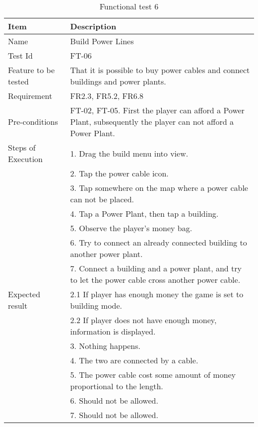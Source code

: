 \begin{table}[H]
\centering
	\begin{tabular}{ l | p{8cm} }
		\hline
		{\bf Item} & {\bf Description} \\ \hline
		Name & Build Power Lines \\ 
		Test Id & FT-06 \\ 
		Feature to be tested &  That it is possible to buy power cables and connect buildings and power plants. \\ 
		Requirement & FR2.3, FR5.2, FR6.8 \\ 
		Pre-conditions & FT-02, FT-05. First the player can afford a Power Plant, subsequently the player can not afford a Power Plant.\\ 
		Steps of Execution & 1. Drag the build menu into view. \\
		& 2. Tap the power cable icon. \\
		& 3. Tap somewhere on the map where a power cable can not be placed. \\
		& 4. Tap a Power Plant, then tap a building. \\
		& 5. Observe the player's money bag. \\
		& 6. Try to connect an already connected building to another power plant. \\
		& 7. Connect a building and a power plant, and try to let the power cable cross another power cable. \\
		Expected result & 2.1 If player has enough money the game is set to building mode. \\
		& 2.2 If player does not have enough money, information is displayed. \\
		& 3. Nothing happens. \\
		& 4. The two are connected by a cable. \\
		& 5. The power cable cost some amount of money proportional to the length. \\
		& 6. Should not be allowed. \\
		& 7. Should not be allowed. \\
	\end{tabular}
	\caption{Functional test 6}
\end{table}

